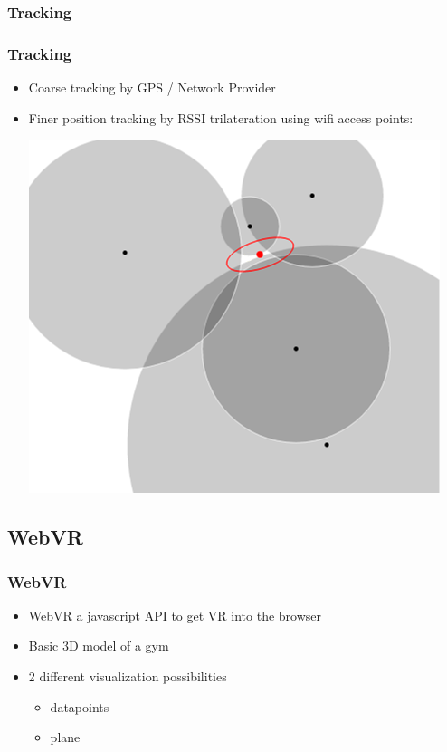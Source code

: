 \documentclass{beamer}
\begin{document}
\subsubsection{Tracking}
\begin{frame}
\frametitle{Tracking}
\begin{itemize}
  	\item	Coarse tracking by GPS / Network Provider
 	\item 	Finer position tracking by RSSI trilateration using wifi access points:\\
			\begin{center}
			\includegraphics[scale=0.5]{trilateration.png}
			\end{center}

\end{itemize}
\end{frame}

\subsection{WebVR}
\begin{frame}
\frametitle{WebVR}
\begin{itemize}
  \item WebVR a javascript API to get VR into the browser \pause
  \item Basic 3D model of a gym \pause
  \item 2 different visualization possibilities
  \begin{itemize}
    \item datapoints
    \item plane
  \end{itemize}
\end{itemize}
\end{frame}
\end{document}
